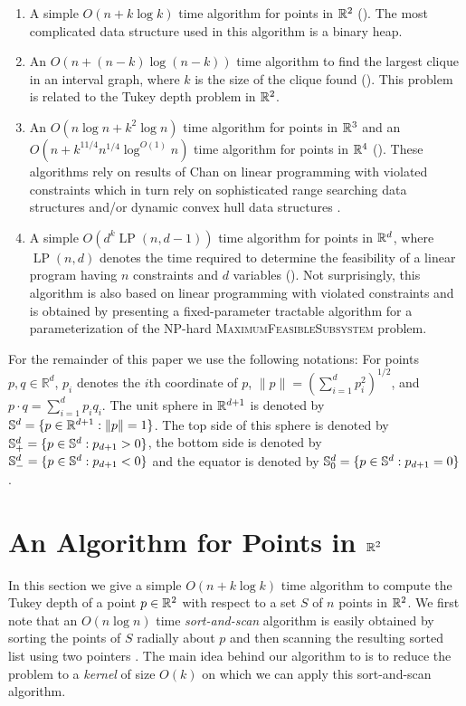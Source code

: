 \documentclass[charterfonts,lotsofwhite]{patmorin}
\DeclareMathOperator{\lp}{LP}
\begin{document}
\begin{enumerate}
\item A simple $O(n + k\log k)$ time algorithm for points in $\mathbb{R}^2$
().  The most complicated data structure used in this
algorithm is a binary heap.

\item An $O(n + (n-k)\log(n-k))$ time algorithm to find the largest
clique in an interval graph, where $k$ is the size of the clique found
().  This problem is related to the Tukey
depth problem in $\mathbb{R}^2$.

\item An $O(n\log n + k^2\log n)$ time algorithm for points in $\mathbb{R}^3$
and an $O(n + k^{11/4}n^{1/4}\log^{O(1)}n)$ time algorithm for points
in $\mathbb{R}^4$ ().  These algorithms rely on results of Chan
on linear programming with violated constraints \cite{c05} which in
turn rely on sophisticated range searching data structures
\cite{m92,r99} and/or dynamic convex hull data structures \cite{bj02}.

\item A simple $O(d^k \lp(n,d-1))$ time algorithm for points in
$\mathbb{R}^d$, where $\lp(n,d)$ denotes the time required to determine the
feasibility of a linear program having $n$ constraints and $d$
variables ().  Not surprisingly, this algorithm is also
based on linear programming with violated constraints and is obtained
by presenting a fixed-parameter tractable algorithm for a
parameterization of the NP-hard \textsc{MaximumFeasibleSubsystem}
problem.
\end{enumerate}

For the remainder of this paper we use the following notations: For
points $p,q\in\mathbb{R}^d$, $p_i$ denotes the $i$th coordinate of
$p$, $\|p\|=(\sum_{i=1}^d p_i^2)^{1/2}$, and $p\cdot
q=\sum_{i=1}^d p_iq_i$.  The unit sphere in $\mathbb{R}^{d+1}$ is denoted by
$\mathbb{S}^d =\{ p\in\mathbb{R}^{d+1} : \|p\|=1\}$. The top side of this sphere is
denoted by $\mathbb{S}^d_+ =\{ p\in\mathbb{S}^{d} : p_{d+1} > 0 \}$, the bottom
side is denoted by $\mathbb{S}^d_- =\{ p\in\mathbb{S}^{d} : p_{d+1} < 0 \}$ and the
equator is denoted by $\mathbb{S}^d_0 =\{ p\in\mathbb{S}^{d} : p_{d+1} = 0 \}$ .

\section{An Algorithm for Points in $\mathbb{R}^2$}

In this section we give a simple $O(n + k\log k)$ time algorithm to
compute the Tukey depth of a point $p\in\mathbb{R}^2$ with respect to a set
$S$ of $n$ points in $\mathbb{R}^2$.  We first note that an $O(n\log n)$ time
\emph{sort-and-scan} algorithm is easily obtained by sorting the
points of $S$ radially about $p$ and then scanning the resulting
sorted list using two pointers \cite{m91}.  The main idea behind our
algorithm to is to reduce the problem to a \emph{kernel} of size
$O(k)$ on which we can apply this sort-and-scan algorithm.
\end{document}
